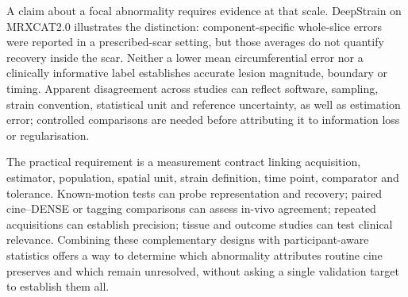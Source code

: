 A claim about a focal abnormality requires evidence at that scale. DeepStrain on MRXCAT2.0 illustrates the distinction: component-specific whole-slice errors were reported in a prescribed-scar setting, but those averages do not quantify recovery inside the scar. Neither a lower mean circumferential error nor a clinically informative label establishes accurate lesion magnitude, boundary or timing. Apparent disagreement across studies can reflect software, sampling, strain convention, statistical unit and reference uncertainty, as well as estimation error; controlled comparisons are needed before attributing it to information loss or regularisation.

The practical requirement is a measurement contract linking acquisition, estimator, population, spatial unit, strain definition, time point, comparator and tolerance. Known-motion tests can probe representation and recovery; paired cine--DENSE or tagging comparisons can assess in-vivo agreement; repeated acquisitions can establish precision; tissue and outcome studies can test clinical relevance. Combining these complementary designs with participant-aware statistics offers a way to determine which abnormality attributes routine cine preserves and which remain unresolved, without asking a single validation target to establish them all.
